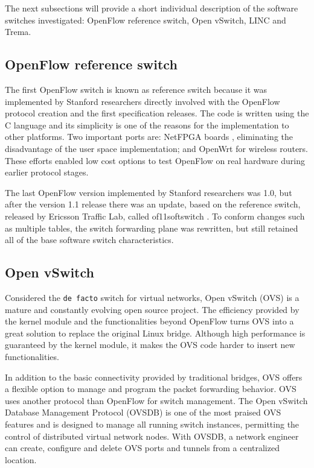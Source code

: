 The next subsections will provide a short individual description of the software switches investigated: OpenFlow reference switch, Open vSwitch, LINC and Trema. 

    \subsection{OpenFlow reference switch}
    \label{sec:sec221}
    
     The first OpenFlow switch is known as reference switch because it was implemented by Stanford researchers directly involved with the OpenFlow protocol creation and the first specification releases. The code is written using the C language and its simplicity is one of the reasons for the implementation to other platforms. Two important ports are: NetFPGA boards \cite{netpfgaof}, eliminating the disadvantage of the user space implementation; and OpenWrt \cite{pantou} for wireless routers. These efforts enabled low cost options to test OpenFlow on real hardware during earlier protocol stages.    
     
     The last OpenFlow version implemented by Stanford researchers was 1.0, but after the version 1.1 release there was an update, based on the reference switch, released by Ericsson Traffic Lab, called of11softswitch \cite{of11softswitch}. To conform changes such as multiple tables, the switch forwarding plane was rewritten, but still retained all of the base software switch characteristics.     

     \subsection{Open vSwitch}
    
    Considered the \texttt{de facto} switch for virtual networks, Open vSwitch \cite{Pfaff_e.a.:extending} (OVS) is a mature and constantly evolving open source project. The efficiency provided by the kernel module and the functionalities beyond OpenFlow turns OVS into a great solution to replace the original Linux bridge. Although high performance is guaranteed by the kernel module, it makes the OVS code harder to insert new functionalities. 
    
    In addition to the basic connectivity provided by traditional bridges, OVS offers a flexible option to manage and program the packet forwarding behavior. OVS uses another protocol than OpenFlow for switch management. The Open vSwitch Database Management Protocol (OVSDB) is one of the most praised OVS features and is designed to manage all running switch instances, permitting the control of distributed virtual network nodes. With OVSDB, a network engineer can create, configure and delete OVS ports and tunnels from a centralized location.

